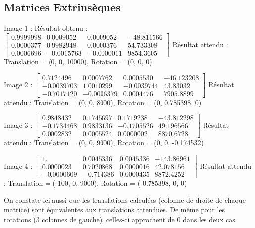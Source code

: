 \documentclass{article}
\begin{document}
\subsection{Matrices Extrinsèques}

Image 1 :
Résultat obtenu :
$\begin{bmatrix}
  0.9999998 & 0.0009052 & 0.0009052 & - 48.811566 \\
  0.0000377 & 0.9982948 & 0.0000376 & 54.733308 \\
  0.0006696 & - 0.0015763 & - 0.0000011 & 9854.3605
\end{bmatrix}$
Résultat attendu :
Translation = (0, 0, 10000), Rotation = (0, 0, 0)

Image 2 :
$\begin{bmatrix}
  0.7124496 & 0.0007762 & 0.0005530 & - 46.123208 \\
  - 0.0039703 & 1.0010299 & - 0.0039744 & 43.83032 \\
  - 0.7017120 & - 0.0006379 & 0.0004476 & 7905.8899
\end{bmatrix}$
Résultat attendu :
Translation = (0, 0, 8000), Rotation = (0, 0.785398, 0)

Image 3 :
$\begin{bmatrix}
  0.9848432 & 0.1745697 & 0.1719238 & - 43.812298 \\
  - 0.1734468 & 0.9833136 & - 0.1705526 & 49.196566 \\
  0.0002832 & 0.0005524 & 0.0000002 & 8870.6728
\end{bmatrix}$
Résultat attendu :
Translation = (0, 0, 9000), Rotation = (0, 0, -0.174532)

Image 4 :
$\begin{bmatrix}
  1. & 0.0045336 & 0.0045336 & - 143.86961 \\
  0.0000023 & 0.7020868 & 0.0000016 & 42.078156 \\
  - 0.0000609 & - 0.714386 & 0.0000435 & 8872.4252
\end{bmatrix}$
Résultat attendu :
Translation = (-100, 0, 9000), Rotation = (-0.785398, 0, 0)

On constate ici aussi que les translations calculées (colonne de droite de chaque matrice) sont équivalentes aux translations attendues.
De même pour les rotations (3 colonnes de gauche), celles-ci approchent de 0 dans les deux cas.

\end{document}
